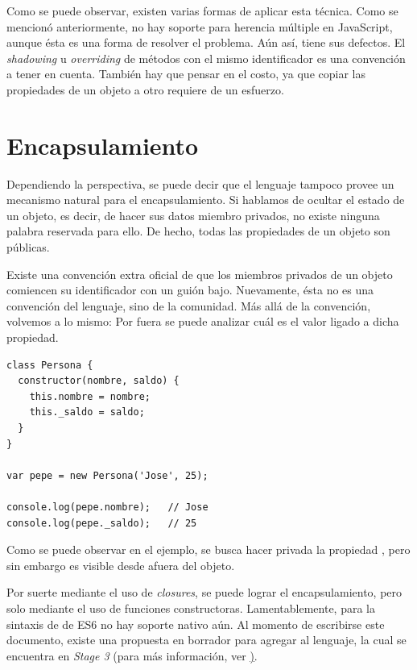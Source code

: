 Como se puede observar, existen varias formas de aplicar esta técnica. Como se mencionó anteriormente, no hay soporte para herencia múltiple en JavaScript, aunque ésta es una forma de resolver el problema. Aún así, tiene sus defectos. El \textit{shadowing} u \textit{overriding} de métodos con el mismo identificador es una convención a tener en cuenta. También hay que pensar en el costo, ya que copiar las propiedades de un objeto a otro requiere de un esfuerzo.

\section{Encapsulamiento}

Dependiendo la perspectiva, se puede decir que el lenguaje tampoco provee un mecanismo natural para el encapsulamiento. Si hablamos de ocultar el estado de un objeto, es decir, de hacer sus datos miembro privados, no existe ninguna palabra reservada para ello. De hecho, todas las propiedades de un objeto son públicas.

Existe una convención extra oficial de que los miembros privados de un objeto comiencen su identificador con un guión bajo. Nuevamente, ésta no es una convención del lenguaje, sino de la comunidad. Más allá de la convención, volvemos a lo mismo: Por fuera se puede analizar cuál es el valor ligado a dicha propiedad.

\begin{lstlisting}[title={Descubriendo variables "`privadas"'}]
class Persona {
  constructor(nombre, saldo) {
    this.nombre = nombre;
    this._saldo = saldo;
  }
}

var pepe = new Persona('Jose', 25);

console.log(pepe.nombre);	// Jose
console.log(pepe._saldo);	// 25
\end{lstlisting}

Como se puede observar en el ejemplo, se busca hacer privada la propiedad , pero sin embargo es visible desde afuera del objeto.

Por suerte mediante el uso de \textit{closures}, se puede lograr el encapsulamiento, pero solo mediante el uso de funciones constructoras. Lamentablemente, para la sintaxis de  de ES6 no hay soporte nativo aún. Al momento de escribirse este documento, existe una propuesta en borrador para agregar al lenguaje, la cual se encuentra en \textit{Stage 3} (para más información, ver \href{https://github.com/tc39/proposal-class-fields#private-fields}).

